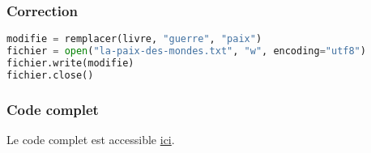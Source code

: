 \documentclass[svgnames,11pt]{beamer}
\begin{document}
\begin{frame}[fragile]
    \frametitle{Correction}

\begin{center}
\begin{lstlisting}[language=Python , basicstyle=\small, xleftmargin=2em, xrightmargin=2em]
modifie = remplacer(livre, "guerre", "paix")
fichier = open("la-paix-des-mondes.txt", "w", encoding="utf8")
fichier.write(modifie)
fichier.close()
\end{lstlisting}
\label{CODE}
\end{center}

\end{frame}
\begin{frame}
    \frametitle{Code complet}

    Le code complet est accessible \href{https://cviroulaud.github.io/terminale/algorithmique/boyer-moore/chercher-remplacer/scripts/chercher-remplacer.zip}{ici}.

\end{frame}
\end{document}

